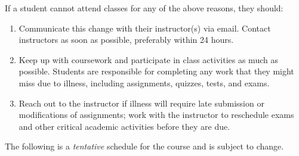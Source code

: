 \documentclass[11pt,letterpaper]{article}
\begin{document}
If a student cannot attend classes for any of the above reasons, they should:

\begin{enumerate}[1.]
\item Communicate this change with their instructor(s) via email. Contact instructors as soon as possible, preferably within 24 hours.

\item Keep up with coursework and participate in class activities as much as possible. Students are responsible for completing any work that they might miss due to illness, including assignments, quizzes, tests, and exams.

\item Reach out to the instructor if illness will require late submission or modifications of assignments; work with the instructor to reschedule exams and other critical academic activities before they are due.
\end{enumerate}
\sectionbreak





The following is a \emph{tentative} schedule for the course and is subject to change. 
        \begin{table}[!ht]
        \centering
        \end{table}
\end{document}
